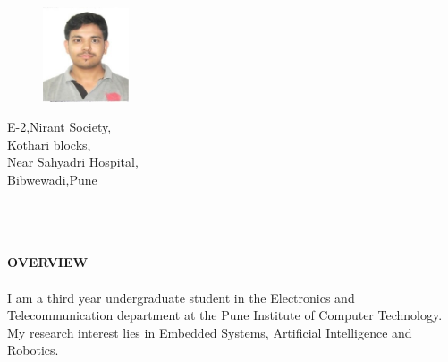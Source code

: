 \documentclass[a4paper,12pt]{report}
\begin{document}
\sloppy 
\begin{figure}
\begin{flushright}
\includegraphics[width=1.0in,height=1.1in]{./image1.jpeg}
\end{flushright}
\end{figure}
\vspace{12pt}
\noindent E-2,Nirant Society,  \\
Kothari blocks, \\
Near Sahyadri Hospital, \\
Bibwewadi,Pune \\
\vspace{12pt}
\\
\\
\\
\vspace{36pt}
\begin{adjustwidth}{-0.59in}{-0.52in}
\textbf{OVERVIEW} \\
\\
I am a third year undergraduate student in the Electronics and Telecommunication department at the Pune Institute of Computer Technology. My research interest lies in Embedded Systems, Artificial Intelligence and Robotics.
\end{adjustwidth}
\end{document}
